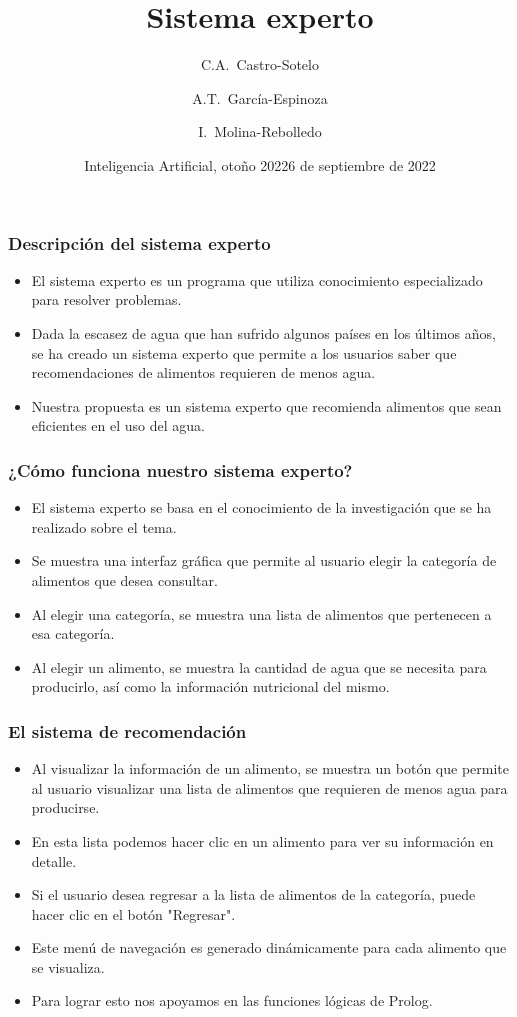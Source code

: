 \documentclass[aspectratio=169]{beamer}
\title{Sistema experto}
\author[Castro-Sotelo, García-Espinoza, Molina-Rebolledo] %
{C.A.~Castro-Sotelo \and A.T.~García-Espinoza \and I.~Molina-Rebolledo}
\institute[BUAP] %
{
  Facultad de Ciencias de la Computación\\
  Benemérita Universidad Autónoma de Puebla
}
\date[Otoño 2022] %
{Inteligencia Artificial, otoño 2022}
\date{6 de septiembre de 2022}
\begin{document}
\frame{\titlepage}


\begin{frame}
\frametitle{Descripción del sistema experto}

\begin{itemize}[<+->]
\item El sistema experto es un programa que utiliza conocimiento especializado para resolver problemas.
\item Dada la escasez de agua que han sufrido algunos países en los últimos años, se ha creado un sistema experto que permite a los usuarios saber que recomendaciones de alimentos requieren de menos agua.
\item Nuestra propuesta es un sistema experto que recomienda alimentos que sean eficientes en el uso del agua.
\end{itemize}
\end{frame}

\begin{frame}
\frametitle{¿Cómo funciona nuestro sistema experto?}

\begin{itemize}[<+->]
\item El sistema experto se basa en el conocimiento de la investigación que se ha realizado sobre el tema.
\item Se muestra una interfaz gráfica que permite al usuario elegir la categoría de alimentos que desea consultar.
\item Al elegir una categoría, se muestra una lista de alimentos que pertenecen a esa categoría.
\item Al elegir un alimento, se muestra la cantidad de agua que se necesita para producirlo, así como la
  información nutricional del mismo.
\end{itemize}
\end{frame}

\begin{frame}
\frametitle{El sistema de recomendación}

\begin{itemize}[<+->]
  \item Al visualizar la información de un alimento, se muestra un botón que permite al usuario
    visualizar una lista de alimentos que requieren de menos agua para producirse.
  \item En esta lista podemos hacer clic en un alimento para ver su información en detalle.
  \item Si el usuario desea regresar a la lista de alimentos de la categoría, puede hacer clic en el botón
    "Regresar".
  \item Este menú de navegación es generado dinámicamente para cada alimento que se visualiza.
  \item Para lograr esto nos apoyamos en las funciones lógicas de Prolog.
\end{itemize}
\end{frame}
\end{document}
